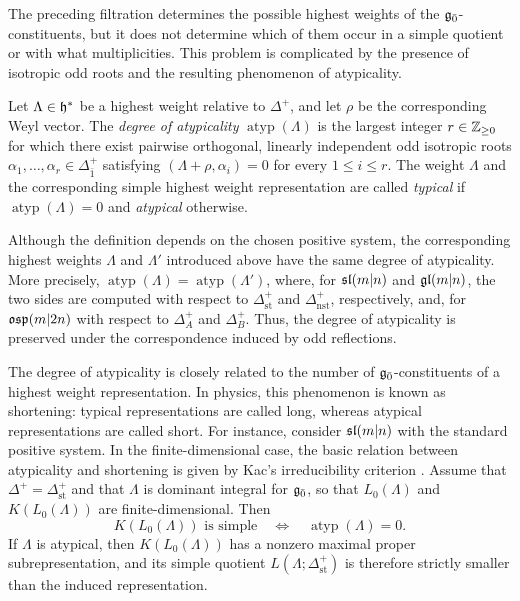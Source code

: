 The preceding filtration determines the possible highest weights of the ${\mathfrak{g}_{\bar{0}}}$-constituents, but it does not determine which of them occur in a simple quotient or with what multiplicities. This problem is complicated by the presence of isotropic odd roots and the resulting phenomenon of atypicality.

\begin{definition}
Let $\Lambda\in{\mathfrak h}^{\ast}$ be a highest weight relative to $\Delta^+$, and let $\rho$ be the corresponding Weyl vector. The \emph{degree of atypicality} $\operatorname{atyp}(\Lambda)$ is the largest integer $r\in{\mathbb Z}_{\geq0}$ for which there exist pairwise orthogonal, linearly independent odd isotropic roots $\alpha_1,\ldots,\alpha_r\in\Delta_{\bar1}^{+}$ satisfying $(\Lambda+\rho,\alpha_i)=0$ for every $1\leq i\leq r$. The weight $\Lambda$ and the corresponding simple highest weight representation are called \emph{typical} if $\operatorname{atyp}(\Lambda)=0$ and \emph{atypical} otherwise.
\end{definition}

\begin{remark}
Although the definition depends on the chosen positive system, the corresponding highest weights $\Lambda$ and $\Lambda'$ introduced above have the same degree of atypicality. More precisely, $\operatorname{atyp}(\Lambda)=\operatorname{atyp}(\Lambda')$, where, for ${\mathfrak{sl}(m\vert n)}$ and ${\mathfrak{gl}(m\vert n)}$, the two sides are computed with respect to $\Delta_{\mathrm{st}}^{+}$ and $\Delta_{\mathrm{nst}}^{+}$, respectively, and, for ${\mathfrak{osp}}(m\vert 2n)$ with respect to $\Delta_{A}^{+}$ and $\Delta_{B}^{+}$. Thus, the degree of atypicality is preserved under the correspondence induced by odd reflections.
\end{remark}

The degree of atypicality is closely related to the number of ${\mathfrak{g}_{\bar{0}}}$-constituents of a highest weight representation. In physics, this phenomenon is known as shortening: typical representations are called long, whereas atypical representations are called short. For instance, consider ${\mathfrak{sl}(m\vert n)}$ with the standard positive system. In the finite-dimensional case, the basic relation between atypicality and shortening is given by Kac's irreducibility criterion \cite{Kac_representations}. Assume that $\Delta^+=\Delta_{\mathrm{st}}^+$ and that $\Lambda$ is dominant integral for ${\mathfrak{g}_{\bar{0}}}$, so that $L_0(\Lambda)$ and $K(L_0(\Lambda))$ are finite-dimensional. Then
\begin{equation}
K(L_0(\Lambda))
\text{ is simple}
\quad\Longleftrightarrow\quad
\operatorname{atyp}(\Lambda)=0.
\end{equation}
If $\Lambda$ is atypical, then $K(L_0(\Lambda))$ has a nonzero maximal proper subrepresentation, and its simple quotient $L(\Lambda;\Delta_{\mathrm{st}}^+)$ is therefore strictly smaller than the induced representation.


